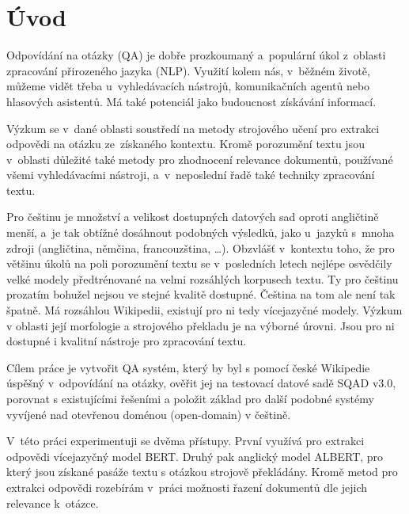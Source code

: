 
\chapter{Úvod}
Odpovídání na otázky (QA) je dobře prozkoumaný a~populární úkol z~oblasti zpracování přirozeného jazyka (NLP). Využití kolem nás, v~běžném životě, můžeme vidět třeba u~vyhledávacích nástrojů, komunikačních agentů nebo hlasových asistentů. Má také potenciál jako budoucnost získávání informací.\par 
Výzkum se v~dané oblasti soustředí na metody strojového učení pro extrakci odpovědi na otázku ze~získaného kontextu. Kromě porozumění textu jsou v~oblasti důležité také metody pro zhodnocení relevance dokumentů, používané všemi vyhledávacími nástroji, a~v~neposlední řadě také techniky zpracování textu.\par
Pro češtinu je množství a velikost dostupných datových sad oproti angličtině menší, a~je tak obtížné dosáhnout podobných výsledků, jako u~jazyků s~mnoha zdroji (angličtina, němčina, francouzština, \dots). Obzvlášť v~kontextu toho, že pro většinu úkolů na poli porozumění textu se v~posledních letech nejlépe osvědčily velké modely předtrénované na velmi rozsáhlých korpusech textu. Ty pro češtinu prozatím bohužel nejsou ve stejné kvalitě dostupné. Čeština na tom ale není tak špatně. Má rozsáhlou Wikipedii, existují pro ni tedy vícejazyčné modely. Výzkum v oblasti její morfologie a strojového překladu je na výborné úrovni. Jsou pro ni dostupné i kvalitní nástroje pro zpracování textu.\par \smallskip

Cílem práce je vytvořit QA systém, který by byl s pomocí české Wikipedie úspěšný v~odpovídání na otázky, ověřit jej na testovací datové sadě SQAD v3.0, porovnat s existujícími řešeními a položit základ pro další podobné systémy vyvíjené nad otevřenou doménou (\mbox{open-domain}) v češtině.\par \smallskip
V~této práci experimentuji se dvěma přístupy. První využívá pro extrakci odpovědi vícejazyčný model BERT. Druhý pak anglický model ALBERT, pro který jsou získané pasáže textu s otázkou strojově překládány. Kromě metod pro extrakci odpovědi rozebírám  v~práci možnosti řazení dokumentů dle jejich relevance k~otázce.\par

